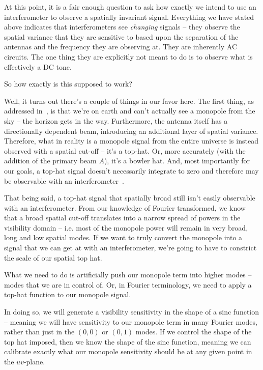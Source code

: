 At this point, it is a fair enough question to ask how exactly we intend to use 
an interferometer to observe a spatially invariant signal. Everything we have 
stated above indicates that interferometers see \emph{changing} signals -- they 
observe the spatial variance that they are sensitive to based upon the 
separation of the antennas and the frequency they are observing at. They are 
inherently AC circuits. The one thing they are explicitly not meant to do is to 
observe what is effectively a DC tone.

So how exactly is this supposed to work?

Well, it turns out there's a couple of things in our favor here. The first 
thing, as addressed in~\citet{presley2015}, is that we're on earth and can't 
actually see a monopole from the sky -- the horizon gets in the way.  
Furthermore, the antenna itself has a directionally dependent beam, introducing 
an additional layer of spatial variance. Therefore, what in reality is a 
monopole signal from the entire universe is instead observed with a spatial 
cut-off -- it's a top-hat.  Or, more accurately (with the addition of the 
primary beam $A$), it's a bowler hat. And, most importantly for our goals, a 
top-hat signal doesn't necessarily integrate to zero and therefore may be 
observable with an interferometer~\citep{venumadhav2016}.

That being said, a top-hat signal that spatially broad still isn't easily 
observable with an interferometer. From our knowledge of Fourier transformed, 
we know that a broad spatial cut-off translates into a narrow spread of powers 
in the visibility domain -- i.e. most of the monopole power will remain in very 
broad, long and low spatial modes. If we want to truly convert the monopole 
into a signal that we can get at with an interferometer, we're going to have to 
constrict the scale of our spatial top hat.

What we need to do is artificially push our monopole term into higher modes -- 
modes that we are in control of. Or, in Fourier terminology, we need to apply a 
top-hat function to our monopole signal. 

In doing so, we will generate a visibility sensitivity in the shape of a sinc 
function -- meaning we will have sensitivity to our monopole term in many 
Fourier modes, rather than just in the $(0,0)$ or $(0,1)$ modes. If we control 
the shape of the top hat imposed, then we know the shape of the sinc function, 
meaning we can calibrate exactly what our monopole sensitivity should be at any 
given point in the $uv$-plane.

